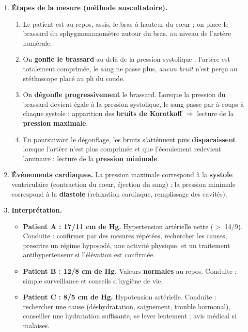 \documentclass[11pt]{article}
\begin{document}
\begin{corrige}
\begin{enumerate}
\item \textbf{Étapes de la mesure (méthode auscultatoire).}
\begin{enumerate}
\item Le patient est au repos, assis, le bras à hauteur du cœur ; on place le brassard du sphygmomanomètre autour du bras, au niveau de l'artère humérale.
\item On \textbf{gonfle le brassard} au-delà de la pression systolique : l'artère est totalement comprimée, le sang ne passe plus, \emph{aucun bruit} n'est perçu au stéthoscope placé au pli du coude.
\item On \textbf{dégonfle progressivement} le brassard. Lorsque la pression du brassard devient égale à la pression systolique, le sang passe par à-coups à chaque systole : apparition des \textbf{bruits de Korotkoff} $\Rightarrow$ lecture de la \textbf{pression maximale}.
\item En poursuivant le dégonflage, les bruits s'atténuent puis \textbf{disparaissent} lorsque l'artère n'est plus comprimée et que l'écoulement redevient laminaire : lecture de la \textbf{pression minimale}.
\end{enumerate}
\item \textbf{Événements cardiaques.} La pression maximale correspond à la \textbf{systole} ventriculaire (contraction du cœur, éjection du sang) ; la pression minimale correspond à la \textbf{diastole} (relaxation cardiaque, remplissage des cavités).
\item \textbf{Interprétation.}
\begin{itemize}
\item \textbf{Patient A : 17/11 cm de Hg.} Hypertension artérielle nette ($>$ 14/9). Conduite : confirmer par des mesures répétées, rechercher les causes, prescrire un régime hyposodé, une activité physique, et un traitement antihypertenseur si l'élévation est confirmée.
\item \textbf{Patient B : 12/8 cm de Hg.} Valeurs \textbf{normales} au repos. Conduite : simple surveillance et conseils d'hygiène de vie.
\item \textbf{Patient C : 8/5 cm de Hg.} Hypotension artérielle. Conduite : rechercher une cause (déshydratation, saignement, trouble hormonal), conseiller une hydratation suffisante, se lever lentement ; avis médical si malaises.
\end{itemize}
\end{enumerate}
\end{corrige}
\end{document}
